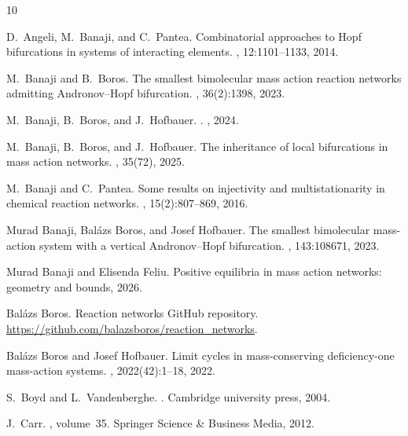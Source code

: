 \documentclass[11pt]{amsart}
\theoremstyle{definition}
\begin{document}
\small

\begin{thebibliography}{10}

D.~Angeli, M.~Banaji, and C.~Pantea.
\newblock Combinatorial approaches to {H}opf bifurcations in systems of
  interacting elements.
, 12:1101--1133, 2014.

M.~Banaji and B.~Boros.
\newblock The smallest bimolecular mass action reaction networks admitting
  {Andronov--Hopf} bifurcation.
, 36(2):1398, 2023.

M.~Banaji, B.~Boros, and J.~Hofbauer.
.
, 2024.

M.~Banaji, B.~Boros, and J.~Hofbauer.
\newblock The inheritance of local bifurcations in mass action networks.
, 35(72), 2025.

M.~Banaji and C.~Pantea.
\newblock Some results on injectivity and multistationarity in chemical
  reaction networks.
, 15(2):807--869, 2016.

Murad Banaji, Bal\'azs Boros, and Josef Hofbauer.
\newblock The smallest bimolecular mass-action system with a vertical
  {A}ndronov--{H}opf bifurcation.
, 143:108671, 2023.

Murad Banaji and Elisenda Feliu.
\newblock Positive equilibria in mass action networks: geometry and bounds,
  2026.

Bal\'azs Boros.
\newblock Reaction networks {G}it{H}ub repository.
\newblock
  \href{https://github.com/balazsboros/reaction_networks}{https://github.com/balazsboros/reaction\_networks}.

Bal\'azs Boros and Josef Hofbauer.
\newblock Limit cycles in mass-conserving deficiency-one mass-action systems.
, 2022(42):1--18, 2022.

S.~Boyd and L.~Vandenberghe.
.
\newblock Cambridge university press, 2004.

J.~Carr.
, volume~35.
\newblock Springer Science \& Business Media, 2012.


\end{thebibliography}
\end{document}
